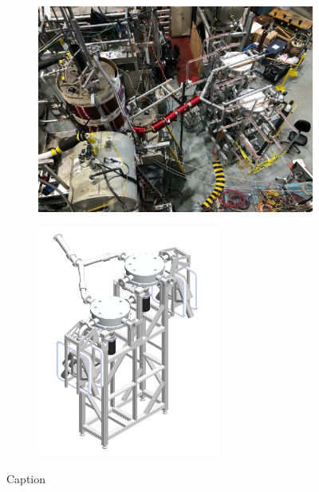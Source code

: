 \begin{figure}
\centering
\begin{subfigure}{.5\textwidth}
  \centering
  \includegraphics[width=\textwidth]{figures/west_beamline_switcher_tests.jpg}
  \vspace{5pt}
  \caption{}\label{subfig:west_beamline_switchers}
\end{subfigure}%
\begin{subfigure}{.5\textwidth}
  \centering
  \includegraphics[height=3in]{figures/switcher_mockup.png}
  \caption{}\label{subfig:switcher_mockup}
\end{subfigure}
\caption
{Caption}
\label{fig:west_beamline_switchers}
\end{figure}




